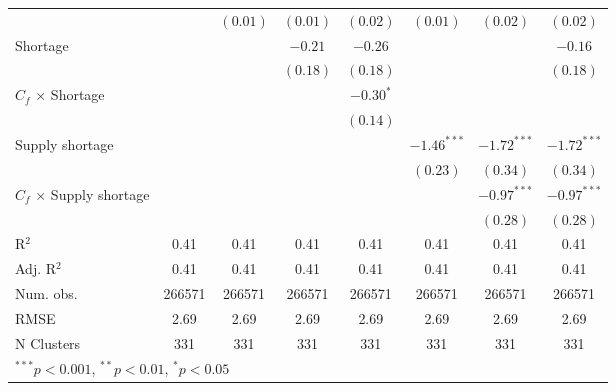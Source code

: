 \begin{tabular}{l c c c c c c c }
                                 &               & $(0.01)$      & $(0.01)$      & $(0.02)$      & $(0.01)$      & $(0.02)$      & $(0.02)$      \\
Shortage                         &               &               & $-0.21$       & $-0.26$       &               &               & $-0.16$       \\
                                 &               &               & $(0.18)$      & $(0.18)$      &               &               & $(0.18)$      \\
$C_{f}$ $\times$ Shortage        &               &               &               & $-0.30^{*}$   &               &               &               \\
                                 &               &               &               & $(0.14)$      &               &               &               \\
Supply shortage                  &               &               &               &               & $-1.46^{***}$ & $-1.72^{***}$ & $-1.72^{***}$ \\
                                 &               &               &               &               & $(0.23)$      & $(0.34)$      & $(0.34)$      \\
$C_{f}$ $\times$ Supply shortage &               &               &               &               &               & $-0.97^{***}$ & $-0.97^{***}$ \\
                                 &               &               &               &               &               & $(0.28)$      & $(0.28)$      \\
\midrule
R$^2$                            & 0.41          & 0.41          & 0.41          & 0.41          & 0.41          & 0.41          & 0.41          \\
Adj. R$^2$                       & 0.41          & 0.41          & 0.41          & 0.41          & 0.41          & 0.41          & 0.41          \\
Num. obs.                        & 266571        & 266571        & 266571        & 266571        & 266571        & 266571        & 266571        \\
RMSE                             & 2.69          & 2.69          & 2.69          & 2.69          & 2.69          & 2.69          & 2.69          \\
N Clusters                       & 331           & 331           & 331           & 331           & 331           & 331           & 331           \\
\bottomrule
\multicolumn{8}{l}{\tiny{$^{***}p<0.001$, $^{**}p<0.01$, $^*p<0.05$}}
\end{tabular}
